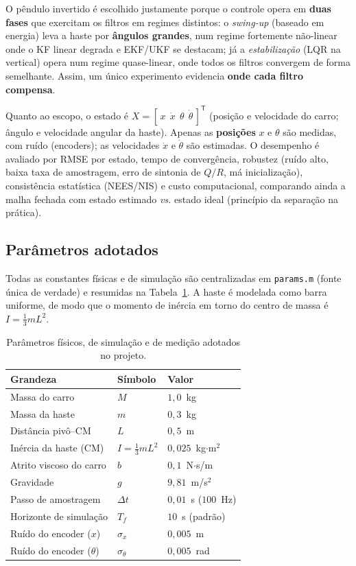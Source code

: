 \documentclass[brazil, 12pt]{article}
\begin{document}
O pêndulo invertido é escolhido justamente porque o controle opera em
\textbf{duas fases} que exercitam os filtros em regimes distintos: o
\emph{swing-up} (baseado em energia) leva a haste por \textbf{ângulos grandes},
num regime fortemente não-linear onde o KF linear degrada e EKF/UKF se destacam;
já a \emph{estabilização} (LQR na vertical) opera num regime quase-linear, onde
todos os filtros convergem de forma semelhante. Assim, um único experimento
evidencia \textbf{onde cada filtro compensa}.

Quanto ao escopo, o estado é
$X = [\,x\ \ \dot{x}\ \ \theta\ \ \dot{\theta}\,]^{\mathsf T}$ (posição e
velocidade do carro; ângulo e velocidade angular da haste). Apenas as
\textbf{posições} $x$ e $\theta$ são medidas, com ruído (encoders); as
velocidades $\dot{x}$ e $\dot{\theta}$ são estimadas. O desempenho é avaliado por
RMSE por estado, tempo de convergência, robustez (ruído alto, baixa taxa de
amostragem, erro de sintonia de $Q/R$, má inicialização), consistência
estatística (NEES/NIS) e custo computacional, comparando ainda a malha fechada
com estado estimado \emph{vs.} estado ideal (princípio da separação na prática).

\subsection{Parâmetros adotados}

Todas as constantes físicas e de simulação são centralizadas em
\texttt{params.m} (fonte única de verdade) e resumidas na
Tabela~\ref{tab:params}. A haste é modelada como barra uniforme, de modo que o
momento de inércia em torno do centro de massa é $I = \tfrac{1}{3}mL^{2}$.

\begin{table}[H]
\centering
\begin{tabular}{l l l}
\hline
\textbf{Grandeza} & \textbf{Símbolo} & \textbf{Valor} \\
\hline
Massa do carro          & $M$            & $1{,}0$~kg \\
Massa da haste          & $m$            & $0{,}3$~kg \\
Distância pivô--CM       & $L$            & $0{,}5$~m \\
Inércia da haste (CM)   & $I=\tfrac{1}{3}mL^{2}$ & $0{,}025$~kg$\cdot$m$^{2}$ \\
Atrito viscoso do carro & $b$            & $0{,}1$~N$\cdot$s/m \\
Gravidade               & $g$            & $9{,}81$~m/s$^{2}$ \\
\hline
Passo de amostragem     & $\Delta t$     & $0{,}01$~s ($100$~Hz) \\
Horizonte de simulação  & $T_f$          & $10$~s (padrão) \\
\hline
Ruído do encoder ($x$)  & $\sigma_x$     & $0{,}005$~m \\
Ruído do encoder ($\theta$) & $\sigma_\theta$ & $0{,}005$~rad \\
\hline
\end{tabular}
\caption{Parâmetros físicos, de simulação e de medição adotados no projeto.}
\label{tab:params}
\end{table}
\end{document}
